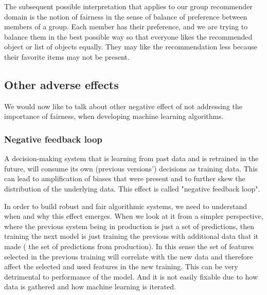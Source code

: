 The subsequent possible interpretation that applies to our group recommender domain is the notion of fairness in the sense of balance of preference between members of a group. Each member has their preference, and we are trying to balance them in the best possible way so that everyone likes the recommended object or list of objects equally. They may like the recommendation less because their favorite items may not be present.


\subsection{Other adverse effects}

We would now like to talk about other negative effect of not addressing the importance of fairness, when developing machine learning algorithms.

\subsubsection{Negative feedback loop}

A decision-making system that is learning from past data and is retrained in the future, will consume its own (previous versions') decisions as training data. This can lead to amplification of biases that were present and to further skew the distribution of the underlying data. This effect is called "negative feedback loop".

In order to build robust and fair algorithmic systems, we need to understand when and why this effect emerges. When we look at it from a simpler perspective, where the previous system being in production is just a set of predictions, then training the next model is just training the previous with additional data that it made ( the set of predictions from production). In this sense the set of features selected in the previous training will correlate with the new data and therefore affect the selected and used features in the new training. This can be very detrimental to performance of the model. And it is not easily fixable due to how data is gathered and how machine learning is iterated.

